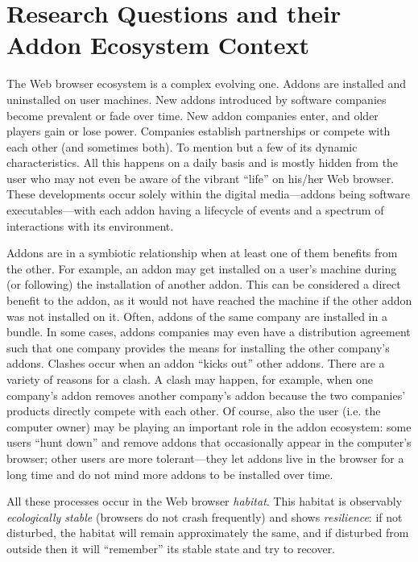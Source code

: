 \documentclass[10pt,letterpaper]{article}
\begin{document}
\section*{Research Questions and their Addon Ecosystem Context}

The Web browser ecosystem is a complex evolving one. Addons are installed and uninstalled on user machines. New addons introduced by software companies become prevalent or fade over time. New addon companies enter, and older players gain or lose power. Companies establish partnerships or compete with each other (and sometimes both). To mention but a few of its dynamic characteristics. All this happens on a daily basis and is mostly hidden from the user who may not even be aware of the vibrant ``life'' on his/her Web browser. These developments occur solely within the digital media---addons being software executables---with each addon having a lifecycle of events and a spectrum of interactions with its environment. 

Addons are in a symbiotic relationship when at least one of them benefits from the other. For example, an addon may get installed on a user's machine during (or following) the installation of another addon. This can be considered a direct benefit to the addon, as it would not have reached the machine if the other addon was not installed on it. Often, addons of the same company are installed in a bundle. In some cases, addons companies may even have a distribution agreement such that one company provides the means for installing the other company's addons. Clashes occur when an addon ``kicks out'' other addons. There are a variety of reasons for a clash. A clash may happen, for example, when one company's addon removes another company's addon because the two companies' products directly compete with each other. Of course, also the user (i.e. the computer owner) may be playing an important role in the addon ecosystem: some users ``hunt down'' and remove addons that occasionally appear in the computer's browser; other users are more tolerant---they let addons live in the browser for a long time and do not mind more addons to be installed over time. 

All these processes occur in the Web browser \textit{habitat}. This habitat is observably \textit{ecologically stable} (browsers do not crash frequently) and shows \textit{resilience}: if not disturbed, the habitat will remain approximately the same, and if disturbed from outside then it will ``remember'' its stable state and try to recover. 
\end{document}
